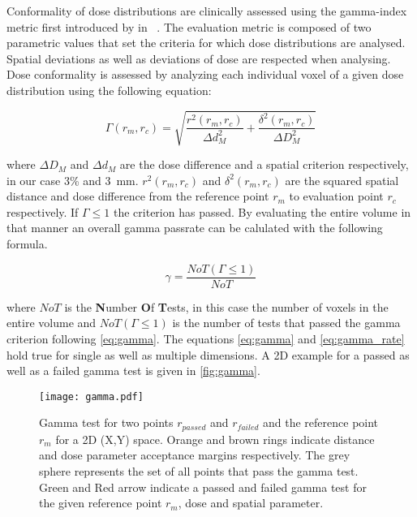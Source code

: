 Conformality of dose distributions are clinically assessed using the gamma-index metric first introduced by \citeauthor{low_technique_1998} in \citeyear{low_technique_1998}~\cite{low_technique_1998}. 
The evaluation metric is composed of two parametric values that set the criteria for which dose distributions are analysed. 
Spatial deviations as well as deviations of dose are respected when analysing. 
Dose conformality is assessed by analyzing each individual voxel of a given dose distribution using the following equation:

\begin{equation}\label{eq:gamma}
    \Gamma (r_m, r_c) = \sqrt{\frac{r^2(r_m,r_c)}{\Delta d^2_M} + \frac{\delta ^2(r_m,r_c)}{\Delta D^2_M}}
\end{equation}

where $\Delta D_M$ and $\Delta d_M$ are the dose difference and a spatial criterion respectively, in our case 3\% and 3~mm.  $r^2(r_m,r_c)$ and $\delta ^2(r_m,r_c)$ are the squared spatial distance and dose difference from the reference point $r_m$ to evaluation point $r_c$ respectively. 
If $\Gamma \leq 1$ the criterion has passed. By evaluating the entire volume in that manner an overall gamma passrate can be calulated with the following formula. 

\begin{equation}\label{eq:gamma_rate}
    \gamma = \frac{NoT(\Gamma \leq 1)}{NoT}
\end{equation}

where $NoT$ is the \textbf{N}umber \textbf{O}f \textbf{T}ests, in this case the number of voxels in the entire volume and $NoT(\Gamma \leq 1)$ is the number of tests that passed the gamma criterion following \autoref{eq:gamma}. The equations \autoref{eq:gamma} and \autoref{eq:gamma_rate} hold true for single as well as multiple dimensions. A 2D example for a passed as well as a failed gamma test is given in \autoref{fig:gamma}. 

\begin{figure}
    \centering
    \texttt{[image: gamma.pdf]}
    \caption{Gamma test for two points $r_{passed}$ and $r_{failed}$ and the reference point $r_m$ for a 2D (X,Y) space. Orange and brown rings indicate distance and dose parameter acceptance margins respectively. The grey sphere represents the set of all points that pass the gamma test. Green and Red arrow indicate a passed and failed gamma test for the given reference point $r_m$, dose and spatial parameter.}\label{fig:gamma}
\end{figure}

